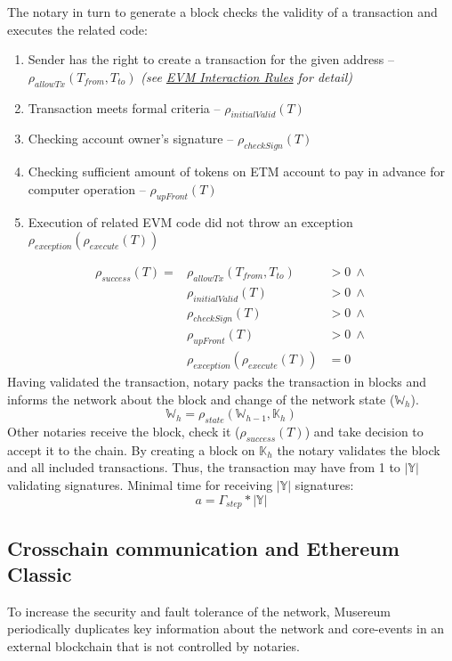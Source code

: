 \documentclass[12pt]{report}
\begin{document}
The notary in turn to generate a block checks the validity of a transaction and executes the related code:
\begin{enumerate}
\item Sender has the right to create a transaction for the given address – $\rho_{allowTx}(T_{from}, T_{to})$ \textit{(see \hyperref[tech-blockchain-rules]{EVM Interaction Rules} for detail)}
\item Transaction meets formal criteria – $\rho_{initialValid}(T)$
\item Checking account owner's signature – $\rho_{checkSign}(T)$
\item Checking sufficient amount of tokens on ETM account to pay in advance for computer operation – $\rho_{upFront}(T)$
\item Execution of related	EVM code	did not 	throw an exception $\rho_{exception}(\rho_{execute}(T))$
\end{enumerate}
\begin{align}
\rho_{success}(T) = 	&\rho_{allowTx}(T_{from}, T_{to}) &> 0 \ \wedge \\
 								&\rho_{initialValid}(T) &> 0 \ \wedge \\
								&\rho_{checkSign}(T) &> 0 \ \wedge \\
								&\rho_{upFront}(T) &> 0 \ \wedge \\
 								&\rho_{exception}(\rho_{execute}(T)) &= 0
\end{align}
Having validated the transaction, notary packs the transaction in blocks and informs the network about the block and change of the network state ($\mathbb{W}_h$).
\begin{equation}
\mathbb{W}_h = \rho_{state}(\mathbb{W}_{h-1}, \mathbb{K}_h)
\end{equation}
Other notaries receive the block, check it ($\rho_{success}(T)$) and take decision to accept it to the chain. By creating a block on $\mathbb{K}_h$ the notary validates the block and all included transactions.
Thus, the transaction may have from 1 to $|\mathbb{Y}|$ validating signatures.
Minimal time for receiving $|\mathbb{Y}|$ signatures:
\begin{equation}
a = \Gamma_{step} * |\mathbb{Y}|
\end{equation}
\vfill\null\pagebreak

\subsection{Crosschain communication and Ethereum Classic}
\label{tech-blockchain-anchoring}
To increase the security and fault tolerance of the network, Musereum periodically duplicates key information about the network and core-events in an external blockchain that is not controlled by notaries.
\end{document}
